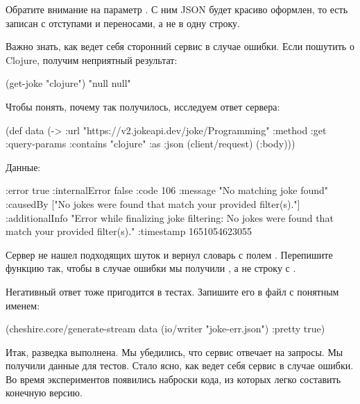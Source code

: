 Обратите внимание на параметр . С ним JSON будет красиво оформлен, то есть записан с отступами и переносами, а не в одну строку.

Важно знать, как ведет себя сторонний сервис в случае ошибки. Если пошутить о Clojure, получим неприятный результат:

\begin{english}
  \begin{clojure}
(get-joke "clojure")
"null null"
  \end{clojure}
\end{english}

Чтобы понять, почему так получилось, исследуем ответ сервера:

\begin{english}
  \begin{clojure}
(def data
  (-> {:url "https://v2.jokeapi.dev/joke/Programming"
       :method :get
       :query-params {:contains "clojure"}
       :as :json}
      (client/request)
      (:body)))
  \end{clojure}
\end{english}

Данные:

\begin{english}
  \begin{clojure}
{:error true
 :internalError false
 :code 106
 :message "No matching joke found"
 :causedBy ["No jokes were found that match your provided filter(s)."]
 :additionalInfo
 "Error while finalizing joke filtering: No jokes were found that match your provided filter(s)."
 :timestamp 1651054623055}
  \end{clojure}
\end{english}

Сервер не нашел подходящих шуток и вернул словарь с полем . Перепишите функцию так, чтобы в случае ошибки мы получили , а не строку с .

Негативный ответ тоже пригодится в тестах. Запишите его в файл с понятным именем:

\begin{english}
  \begin{clojure}
(cheshire.core/generate-stream
  data (io/writer "joke-err.json") {:pretty true})
  \end{clojure}
\end{english}

Итак, разведка выполнена. Мы убедились, что сервис отвечает на запросы. Мы получили данные для тестов. Стало ясно, как ведет себя сервис в случае ошибки. Во время экспериментов появились наброски кода, из которых легко составить конечную версию.

